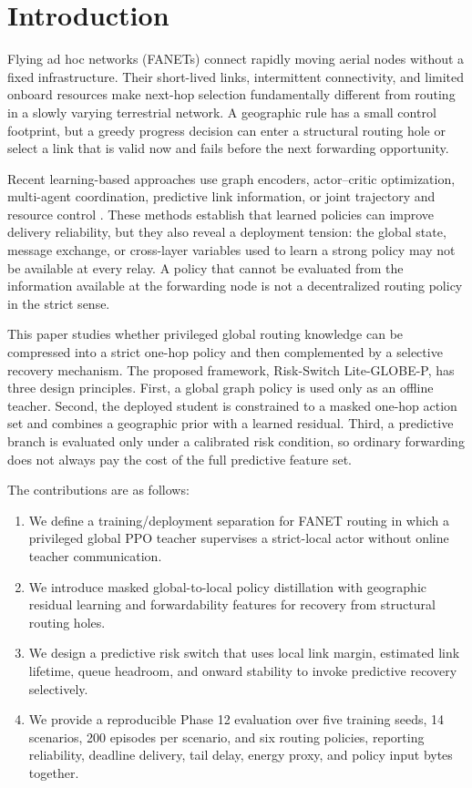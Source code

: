 \documentclass[drones,article,submit,moreauthors]{Definitions/mdpi}
\newcommand{\method}{Risk-Switch Lite-GLOBE-P}
\begin{document}
\section{Introduction}

Flying ad hoc networks (FANETs) connect rapidly moving aerial nodes without a fixed infrastructure. Their short-lived links, intermittent connectivity, and limited onboard resources make next-hop selection fundamentally different from routing in a slowly varying terrestrial network. A geographic rule has a small control footprint, but a greedy progress decision can enter a structural routing hole or select a link that is valid now and fails before the next forwarding opportunity.

Recent learning-based approaches use graph encoders, actor--critic optimization, multi-agent coordination, predictive link information, or joint trajectory and resource control \cite{Alam2024JTFR,Wu2026AoI,Shou2026Adaptive,Zhang2026LargeScale}. These methods establish that learned policies can improve delivery reliability, but they also reveal a deployment tension: the global state, message exchange, or cross-layer variables used to learn a strong policy may not be available at every relay. A policy that cannot be evaluated from the information available at the forwarding node is not a decentralized routing policy in the strict sense.

This paper studies whether privileged global routing knowledge can be compressed into a strict one-hop policy and then complemented by a selective recovery mechanism. The proposed framework, \method, has three design principles. First, a global graph policy is used only as an offline teacher. Second, the deployed student is constrained to a masked one-hop action set and combines a geographic prior with a learned residual. Third, a predictive branch is evaluated only under a calibrated risk condition, so ordinary forwarding does not always pay the cost of the full predictive feature set.

The contributions are as follows:
\begin{enumerate}[leftmargin=*]
    \item We define a training/deployment separation for FANET routing in which a privileged global PPO teacher supervises a strict-local actor without online teacher communication.
    \item We introduce masked global-to-local policy distillation with geographic residual learning and forwardability features for recovery from structural routing holes.
    \item We design a predictive risk switch that uses local link margin, estimated link lifetime, queue headroom, and onward stability to invoke predictive recovery selectively.
    \item We provide a reproducible Phase 12 evaluation over five training seeds, 14 scenarios, 200 episodes per scenario, and six routing policies, reporting reliability, deadline delivery, tail delay, energy proxy, and policy input bytes together.
\end{enumerate}
\end{document}
